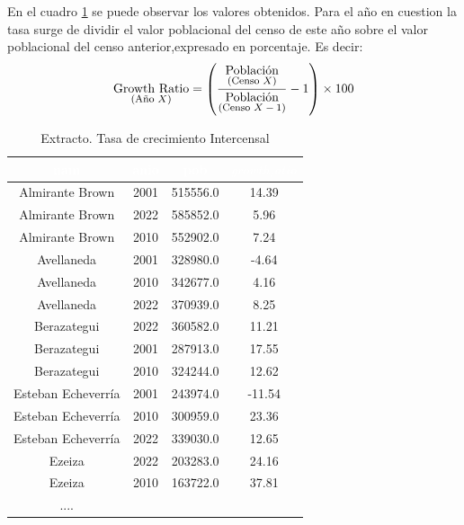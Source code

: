 \documentclass{article}
\theoremstyle{mytheoremstyle}
\theoremstyle{mytheoremstyle}
\theoremstyle{myproblemstyle}
\begin{document}
  En el cuadro \ref{tab:RatiosAll} se puede observar los valores obtenidos. Para el año en cuestion la tasa surge de dividir el valor poblacional
  del censo de este año sobre el valor poblacional del censo anterior,expresado en porcentaje.\newline
  Es decir: \newline
  \begin{equation}
    \underset{\text{\footnotesize(Año $X$)}}{\text{Growth Ratio}} = 
    \left( \frac{\underset{\text{\footnotesize(Censo $X$)}}{\text{Población}}}{\underset{\text{\footnotesize(Censo $X-1$)}}{\text{Población}}} - 1 \right) \times 100
  \end{equation}
  \newline

  \begin{table}[htb]
    \centering
    \begin{tabular}{|c|c|c|c|}
    \hline
    \textbf{\cellcolor[rgb]{0,0.231,0.427}\textcolor{white}{nam}} &
     \textbf{\cellcolor[rgb]{0,0.231,0.427}\textcolor{white}{anio}}
      & \textbf{\cellcolor[rgb]{0,0.231,0.427}\textcolor{white}{pob}}
       & \textbf{\cellcolor[rgb]{0,0.231,0.427}\textcolor{white}{$growth_ratio$}} \\ \hline
    Almirante Brown & 2001 & 515556.0 & 14.39 \\
    Almirante Brown & 2022 & 585852.0 & 5.96 \\
    Almirante Brown & 2010 & 552902.0 & 7.24 \\
    Avellaneda & 2001 & 328980.0 & -4.64 \\
    Avellaneda & 2010 & 342677.0 & 4.16 \\
    Avellaneda & 2022 & 370939.0 & 8.25 \\
    Berazategui & 2022 & 360582.0 & 11.21 \\
    Berazategui & 2001 & 287913.0 & 17.55 \\
    Berazategui & 2010 & 324244.0 & 12.62 \\
    Esteban Echeverría & 2001 & 243974.0 & -11.54 \\
    Esteban Echeverría & 2010 & 300959.0 & 23.36 \\
    Esteban Echeverría & 2022 & 339030.0 & 12.65 \\
    Ezeiza & 2022 & 203283.0 & 24.16 \\
    Ezeiza & 2010 & 163722.0 & 37.81 \\
    ....& & & \\
  
    \hline
    \end{tabular}
    \caption{Extracto. Tasa de crecimiento Intercensal}
  \label{tab:RatiosAll}
    \end{table}
  
\end{document}
